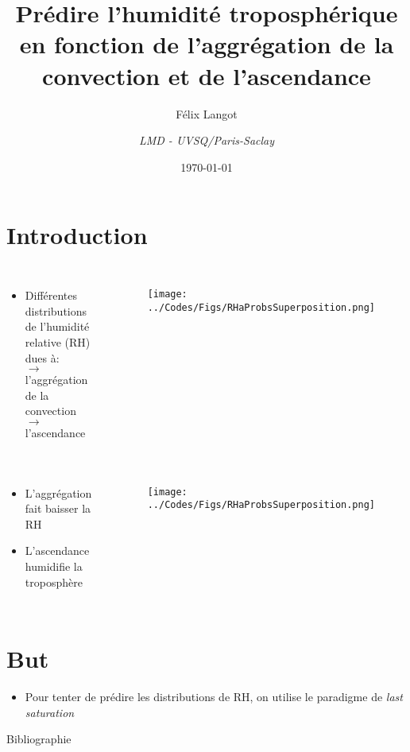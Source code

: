 \documentclass[10pt]{beamer}
\title{Prédire l'humidité troposphérique en fonction de l'aggrégation de la convection et de l'ascendance}
\subtitle{Félix Langot}
\date{\today}
\author{\textit{LMD - UVSQ/Paris-Saclay}}
\institute{}
\begin{document}
\maketitle

\section*{Introduction}
\begin{frame}{\secname}
    \begin{columns}
            \begin{itemize}
                \item Différentes distributions de l'humidité relative (RH) dues à: \\
                $\rightarrow$ l'aggrégation de la convection \\
                $\rightarrow$ l'ascendance
            \end{itemize}
        \begin{figure}
            \centering
            \texttt{[image: ../Codes/Figs/RHaProbsSuperposition.png]}
            \label{RHactual}
        \end{figure}
    \end{columns}
\end{frame}

\begin{frame}{\secname}
    \begin{columns}
            \begin{itemize}
                \item L'aggrégation fait baisser la RH \item L'ascendance humidifie la troposphère
            \end{itemize}
        \begin{figure}
            \centering
            \texttt{[image: ../Codes/Figs/RHaProbsSuperposition.png]}
        \end{figure}
    \end{columns}
\end{frame}

\section*{But}
\begin{frame}{\secname}
     \begin{itemize}
         \item Pour tenter de prédire les distributions de RH, on utilise le paradigme de \textit{last saturation} \autocite{sherwoodMaintenanceFreeTroposphericTropical1996}
     \end{itemize}
\end{frame}

\begin{frame}{Bibliographie}
    \printbibliography
\end{frame}
\end{document}
